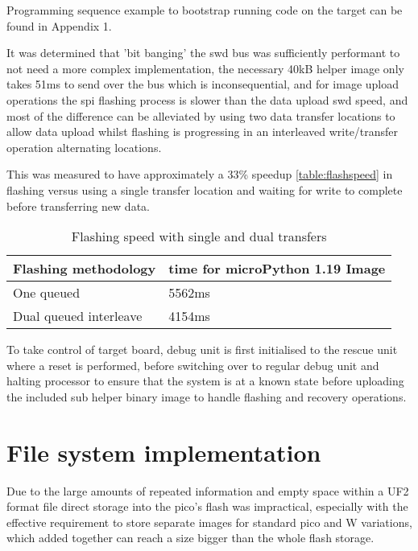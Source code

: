 Programming sequence example to bootstrap running code on the target can be found in Appendix 1.

It was determined that 'bit banging' the \gls{swd} bus was sufficiently performant to not need a more complex implementation, the necessary 40kB helper image only takes 51ms to send over the bus which is inconsequential, and for  image upload operations the \gls{spi} flashing process is slower than the data upload  \gls{swd} speed, and most of the difference can be alleviated by using two data transfer locations to allow data upload whilst flashing is progressing in an interleaved write/transfer operation alternating locations.

This was measured to have approximately a 33\% speedup \autoref{table:flashspeed} in flashing versus using a single transfer location and waiting for write to complete before transferring new data.

\begin{table}[h]
	\centering
	\caption{Flashing speed with single and dual transfers}%
	\vspace{-16.5pt}%
	
	\begin{tabular}{|l|l|}
		\hline
		Flashing methodology & time for microPython 1.19 Image  \\ \hline
		One queued & 5562ms \\ \hline
		Dual queued interleave & 4154ms \\ \hline
	\end{tabular}
	\label{table:flashspeed}
\end{table}

To take control of target board, debug unit is first initialised to the rescue unit where a reset is performed, before switching over to regular debug unit and halting processor to ensure that the system is at a known state before uploading the  included sub helper binary image to handle flashing and recovery operations.

\clearpage
\section{File system implementation}

Due to the large amounts of repeated information and empty space within a UF2 format file direct storage into the pico's flash was impractical, especially with the effective requirement to store separate images for standard pico and W variations, which added together can reach a size bigger than the whole flash storage.

